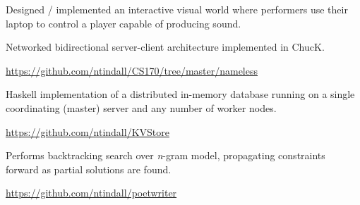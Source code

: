 \documentclass[letterpaper]{deedy-resume} %
\begin{document}
\begin{minipage}[t]{0.66\textwidth}
\begin{tightitemize}
\item Designed / implemented an interactive visual world where performers use their laptop to control a player capable of producing sound.
\item Networked bidirectional server-client architecture implemented in ChucK.
\item \url{https://github.com/ntindall/CS170/tree/master/nameless}
\end{tightitemize}
\sectionspace %

\begin{tightitemize}
\item Haskell implementation of a distributed in-memory database running on a
single coordinating (master) server and any number of worker nodes.
\item \url{https://github.com/ntindall/KVStore}
\end{tightitemize}
\sectionspace %

\begin{tightitemize}
\item Performs backtracking search over \emph{n}-gram model, propagating constraints forward as partial solutions are found.
\item \url{https://github.com/ntindall/poetwriter}
\end{tightitemize}
\sectionspace %




%


\end{minipage}
\end{document}
